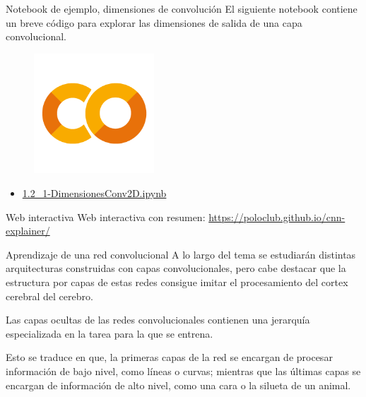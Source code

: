 \begin{frame}{Notebook de ejemplo, dimensiones de convolución}
El siguiente notebook contiene un breve código para explorar las \alert{dimensiones de salida} de una capa convolucional.

\begin{figure}
    \centering
    \includegraphics[width=0.4\textwidth]{figures/GoogleColab.png}
\end{figure}
\begin{itemize}
    \centering
    \item {\Large \href{https://colab.research.google.com/drive/1UpvEAbh6kwSScuOJjf7228ZA5lWCHihO?usp=sharing}{1.2\_1-DimensionesConv2D.ipynb}}
\end{itemize}
\end{frame}

\begin{frame}{Web interactiva}
Web interactiva con resumen: \href{https://poloclub.github.io/cnn-explainer/}{https://poloclub.github.io/cnn-explainer/}
\end{frame}

\begin{frame}{Aprendizaje de una red convolucional}
A lo largo del tema se estudiarán distintas \alert{arquitecturas} construidas con capas convolucionales, pero cabe destacar que la \alert{estructura por capas} de estas redes consigue \alert{imitar} el procesamiento del \alert{cortex cerebral} del cerebro.

Las capas \alert{ocultas} de las redes convolucionales contienen una \alert{jerarquía} especializada en la tarea para la que se entrena.

Esto se traduce en que, la \alert{primeras} capas de la red se encargan de procesar información de \alert{bajo nivel}, como \alert{líneas} o \alert{curvas}; mientras que las \alert{últimas} capas se encargan de información de \alert{alto nivel}, como una cara o la silueta de un animal.
\end{frame}

